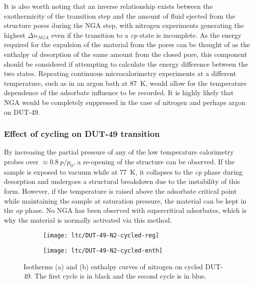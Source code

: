 It is also worth noting that an inverse relationship exists 
between the exothermicity of the transition step and the 
amount of fluid ejected from the structure pores during the NGA 
step, with nitrogen experiments generating the highest \(\Delta n_{NGA}\)
even if the transition to a \textit{cp} state is incomplete.
As the energy required for the expulsion of the material from the 
pores can be thought of as the enthalpy of desorption of the same amount
from the closed pore, this component should be considered if 
attempting to calculate the energy difference between the two states.
Repeating continuous microcalorimetry experiments at a different 
temperature, such as in an argon bath at \SI{87}{\kelvin}, would 
allow for the temperature dependence of the adsorbate influence 
to be recorded. It is highly likely that NGA would be completely 
suppressed in the case of nitrogen and perhaps argon on DUT-49.

\subsubsection{Effect of cycling on DUT-49 transition}

By increasing the partial pressure of any of the low temperature 
calorimetry probes over \(\approx 0.8~p/p_0\), a re-opening
of the structure can be observed. If the sample is exposed to 
vacuum while at \SI{77}{\kelvin}, it collapses to the \textit{cp}
phase during desorption and undergoes a structural breakdown 
due to the instability of this form. However, if the temperature 
is raised above the adsorbate critical point while maintaining the
sample at saturation pressure, the material can be kept in the 
\textit{op} phase. No NGA has been observed with supercritical 
adsorbates, which is why the material is normally activated via
this method. 

\begin{figure}[htb]
    \centering
    \begin{subfigure}[c]{0.5\linewidth}
        \texttt{[image: ltc/DUT-49-N2-cycled-reg]}%
        \caption{}\label{dut:fig:dut-49-cycle-reg}
    \end{subfigure}%
    \begin{subfigure}[h]{0.5\linewidth}
        \centering
        \texttt{[image: ltc/DUT-49-N2-cycled-enth]}%
        \caption{}\label{dut:fig:dut-49-cycle-enth}
    \end{subfigure}%
    \caption{Isotherms (a) and (b) enthalpy curves of nitrogen on
    cycled DUT-49. The first cycle is in black and the second 
    cycle is in blue.}%
    \label{dut:fig:dut-49-cycle}
\end{figure}

